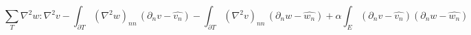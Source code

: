 $$
\sum_T \nabla^2 w : \nabla^2 v
- \int_{\partial T} (\nabla^2 w)_{nn} \, (\partial_n v - \widehat{v_n})
- \int_{\partial T} (\nabla^2 v)_{nn} \, (\partial_n w - \widehat{w_n}) + \alpha \int_E (\partial_n v - \widehat{v_n}) (\partial_n w - \widehat{w_n})
$$








